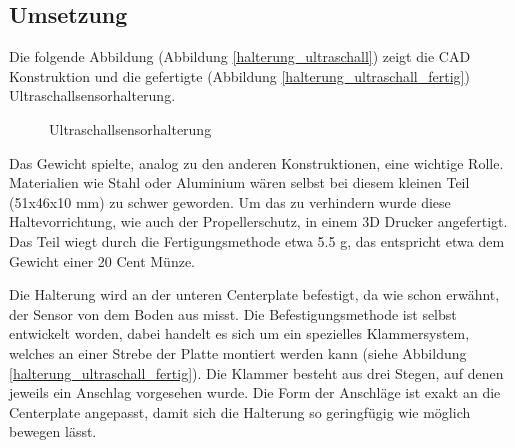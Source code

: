 	\subsection{Umsetzung}

	Die folgende Abbildung (Abbildung \ref{halterung_ultraschall}) zeigt die CAD Konstruktion und die gefertigte (Abbildung \ref{halterung_ultraschall_fertig}) Ultraschallsensorhalterung.

			\begin{figure}[H]
				\begin{centering}
				\par\end{centering}
				\caption{Ultraschallsensorhalterung}
				\label{Halterung_Ultraschallsensor}
			\end{figure}

	Das Gewicht spielte, analog zu den anderen Konstruktionen, eine wichtige Rolle.
	Materialien wie Stahl oder Aluminium wären selbst bei diesem kleinen Teil (51x46x10 mm) zu schwer geworden.
	Um das zu verhindern wurde diese Haltevorrichtung, wie auch der Propellerschutz, in einem 3D Drucker angefertigt.
	Das Teil wiegt durch die Fertigungsmethode etwa 5.5 g, das entspricht etwa dem Gewicht einer 20 Cent Münze.

	Die Halterung wird an der unteren Centerplate befestigt, da wie schon erwähnt, der Sensor von dem Boden aus misst.
	Die Befestigungsmethode ist selbst entwickelt worden, dabei handelt es sich um ein spezielles Klammersystem, welches an einer Strebe der Platte montiert werden kann (siehe Abbildung \ref{halterung_ultraschall_fertig}).
	Die Klammer besteht aus drei Stegen, auf denen jeweils ein Anschlag vorgesehen wurde.
	Die Form der Anschläge ist  exakt an die Centerplate angepasst, damit sich die Halterung so geringfügig wie möglich bewegen lässt.


